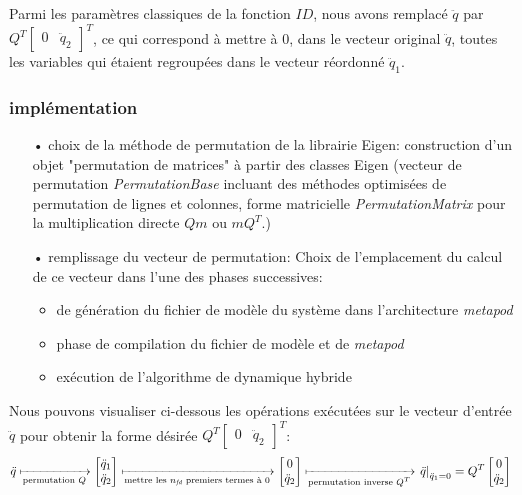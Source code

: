 \documentclass{report}
\begin{document}
Parmi les paramètres classiques de la fonction $ID$, nous avons remplacé $\ddot{q}$ par 
\(Q^T \begin{bmatrix} 0 & \ddot{q}_2 \end{bmatrix}^T\), 
ce qui correspond à mettre à 0, dans le vecteur original $\ddot{q}$, toutes les variables qui étaient regroupées dans le vecteur réordonné $\ddot{q}_1$.\\


\subsubsection{implémentation}

\begin{itemize}
  \item[•] choix de la méthode de permutation de la librairie Eigen: construction d'un objet "permutation de matrices" à partir des classes Eigen (vecteur de permutation \emph{PermutationBase} incluant des méthodes optimisées de permutation de lignes et colonnes, forme matricielle \emph{PermutationMatrix} pour la multiplication directe $Qm$ ou $mQ^T$.)
  \item[•] remplissage du vecteur de permutation: Choix de l'emplacement du calcul de ce vecteur dans l'une des phases successives:
  \begin{itemize}
    \item de génération du fichier de modèle du système dans l'architecture \emph{metapod}
    \item phase de compilation du fichier de modèle et de \emph{metapod}
    \item exécution de l'algorithme de dynamique hybride
  \end{itemize}
\end{itemize}
\medskip
Nous pouvons visualiser ci-dessous les opérations exécutées sur le vecteur d'entrée $\ddot{q}$ pour obtenir la forme désirée \(Q^T \begin{bmatrix} 0 & \ddot{q}_2 \end{bmatrix}^T\):
\begin{equation*}
\ddot{q} \xmapsto[\textnormal{permutation $Q$}]{} 
\begin{bmatrix}
  \ddot{q}_1 \\
  \ddot{q}_2
\end{bmatrix}
\xmapsto[\textnormal{mettre les $n_{\emph{fd}}$ premiers termes à 0}]{} 
\begin{bmatrix}
  0 \\
  \ddot{q}_2
\end{bmatrix}
\xmapsto[\textnormal{permutation inverse $Q^T$}]{} 
\left. \ddot{q} \right\vert_{\ddot{q}_1=0} = Q^T
\begin{bmatrix}
  0 \\
  \ddot{q}_2
\end{bmatrix}
\end{equation*}
\end{document}
